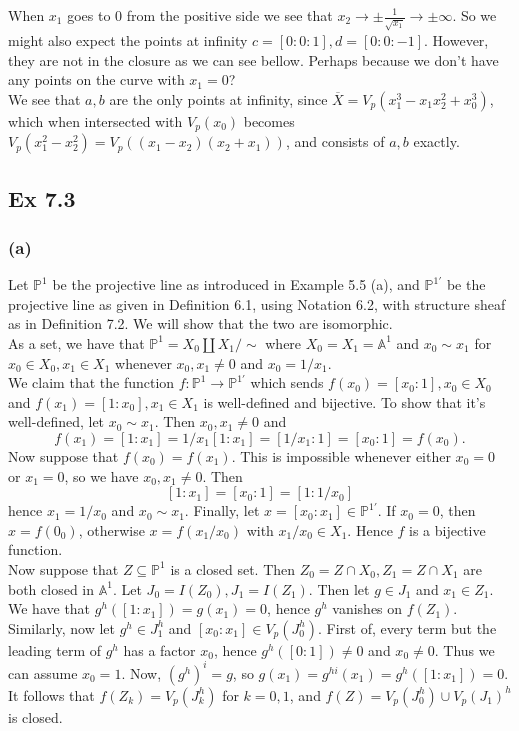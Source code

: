 \documentclass{article}
\theoremstyle{definition}
\renewcommand{\P}{\mathbb{P}}
\newcommand{\A}{\mathbb{A}}
\renewcommand{\AA}[1]{\A^{#1}}
\newcommand{\PP}[1]{\P^{#1}}
\begin{document}
When $x_1$ goes to $0$ from the positive side we see that $x_2 \to \pm
\frac{1}{\sqrt{x_1}} \to \pm \infty$. So we might also expect the points at
infinity $c = [0 : 0 : 1], d = [0 : 0 : -1]$. However, they are not in the
closure as we can see bellow. Perhaps because we don't have any points on the
curve with $x_1 = 0$? \\

We see that $a, b$ are the only points at infinity, since $\overline{X} =
V_p(x_1^{3} - x_1x_2^2 + x_0^{3})$, which when intersected with $V_p(x_0)$
becomes $V_p(x_1^{2} - x_2^{2}) = V_p((x_1 - x_2)(x_2 + x_1))$, and consists of
$a, b$ exactly. 


\subsection*{Ex 7.3}

\subsubsection*{(a)}

Let $\PP{1}$ be the projective line as introduced in Example 5.5 (a), and
$\PP{1'}$ be the projective line as given in Definition 6.1, using Notation
6.2, with structure sheaf as in Definition 7.2. We will show that the two are
isomorphic. \\

As a set, we have that $\PP{1} = X_0 \coprod X_1 / \sim$ where $X_0 = X_1 =
\AA{1}$ and $x_0 \sim x_1$ for $x_0 \in X_0, x_1 \in X_1$ whenever $x_0, x_1
\not = 0$ and $x_0 = 1/x_1$. \\ 

We claim that the function $f : \PP{1} \to \PP{1'}$ which sends $f(x_0) = [x_0 :
1], x_0 \in X_0$ and $f(x_1) = [1 : x_0], x_1 \in X_1$ is well-defined and
bijective. To show that it's well-defined, let $x_0 \sim x_1$. Then $x_0, x_1
\not = 0$ and
\[
	f(x_1) = [1 : x_1] = 1/x_1 [1 : x_1] = [1/x_1 : 1] = [x_0 : 1] = f(x_0).
\]
Now suppose that $f(x_0) = f(x_1)$. This is impossible whenever either $x_0 =
0$ or $x_1 = 0$, so we have $x_0, x_1 \not = 0$. Then
\[
	[1 : x_1] = [x_0 : 1] = [1 : 1/x_0]
\]
hence $x_1 = 1/x_0$ and $x_0 \sim x_1$. Finally, let $x = [x_0 : x_1] \in
\PP{1'}$. If $x_0 = 0$, then $x = f(0_0)$, otherwise $x = f(x_1/x_0)$ with
$x_1/x_0 \in X_1$. Hence $f$ is a bijective function. \\

Now suppose that $Z \subseteq \PP{1}$ is a closed set. Then $Z_0 = Z \cap X_0,
Z_1 = Z \cap X_1$ are both closed in $\AA{1}$. Let $J_0 = I(Z_0), J_1 =
I(Z_1)$. Then let $g \in J_1$ and $x_1 \in Z_1$. We have that $g^{h}([1 : x_1])
= g(x_1) = 0$, hence $g^{h}$ vanishes on $f(Z_1)$. Similarly, now let
$g^{h} \in J_1^{h}$ and $[x_0:x_1] \in V_p(J_0^{h})$. First of, every term but
the leading term of $g^{h}$ has a factor $x_0$, hence $g^{h}([0 : 1]) \not = 0$
and $x_0 \not = 0$. Thus we can assume $x_0 = 1$. Now, $(g^{h})^{i} = g$, so
$g(x_1) = g^{hi}(x_1) = g^{h}([1 : x_1]) = 0$. It follows that $f(Z_k) =
V_p(J_k^{h})$ for $k = 0,1$, and $f(Z) = V_p(J_0^{h}) \cup V_p(J_1)^{h}$
is closed. \\
\end{document}
